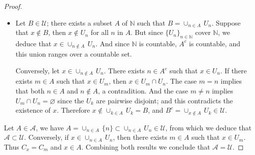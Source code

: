 \documentclass[11pt,a4paper,twoside]{article}
\theoremstyle{definition}
\begin{document}
\begin{proof}
\begin{itemize}
  \item Let $B \in \mathscr{U}$; there exists a subset $A$ of $\mathbb{N}$ such that $B = \cup_{n \in A} \,U_n$. Suppose that $x \notin B$,
    then $x \notin U_n$ for all $n$ in $A$. But since $\{ U_n \}_{n \in \mathbb{N}}$ cover $\mathbb{N}$, we deduce that
    $x \in \cup_{n \notin A} \,U_n$. And since $\mathbb{N}$ is countable, $A^c$ is countable, and this union ranges over a countable set.

    Conversely, let $x \in \cup_{n \notin A} \,U_n$. There exists $n \in A^c$ such that $x \in U_n$. If there exists $m \in A$ such
    that $x \in U_m$, then $x \in U_m \cap U_n$. The case $m = n$ implies that both $n \in A$ and $n \notin A$, a contradition.
    And the case $m \neq n$ implies $U_m \cap U_n = \varnothing$ since the $U_k$ are pairwise disjoint; and this contradicts the
    existence of $x$. Therefore $x \notin \cup_{k \in A} \,U_k = B$, and $B^c = \cup_{x \notin A} \,U_k \in \mathscr{U}$.

  \end{itemize}

  Let $A \in \mathscr{A}$, we have $A = \cup_{n \in A} \,\{ n \} \subset \cup_{n \in A} \,U_n \in \mathscr{U}$,
  from which we deduce that $\mathscr{A} \subset \mathscr{U}$. Conversely, if $x \in \cup_{n \in A} \,U_n$,
  then there exists $m \in A$ such that $x \in U_m$. Thus $C_x = C_m$ and $x \in A$.
  Combining both results we conclude that $\mathscr{A} = \mathscr{U}$.

\end{proof}
\end{document}
